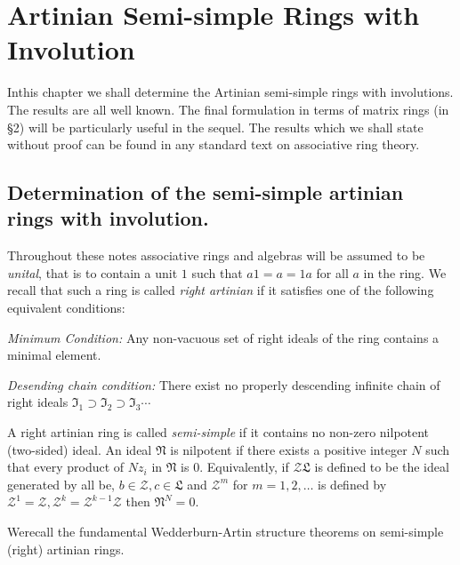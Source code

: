 \setcounter{chapter}{-1}
\chapter{Artinian Semi-simple Rings with Involution}\label{c0}

In\pageoriginale this chapter we shall determine the Artinian
semi-simple rings with involutions. The results are all well
known. The final formulation in terms of matrix rings (in \S 2) will
be particularly useful in the sequel. The results which we shall state
without proof can be found in any standard text on associative ring
theory. 

\section[Determination of the semi-simple artinian
rings...]{Determination of the semi-simple artinian rings with 
involution.}\label{c0:sec1} 

Throughout these notes associative rings and algebras will be assumed
to be {\em unital}, that is to contain a unit $1$ such that $a1=a=1a$
for all $a$ in the ring. We recall that such a ring is called {\em
right artinian} if it satisfies one of the following equivalent
conditions: 

\medskip
{\em Minimum Condition:} Any non-vacuous set of right ideals of the
ring contains a minimal element. 

\medskip
{\em Desending chain condition:} There exist no properly descending
infinite chain of right ideals
$\mathfrak{I}_1\supset\mathfrak{I}_2\supset\mathfrak{I}_3\cdots$ 

A right artinian ring is called {\em semi-simple} if it contains no
non-zero nilpotent (two-sided) ideal. An ideal $\mathfrak{N}$ is
nilpotent if there exists a positive integer $N$ such that every
product of $N z_i$ in $\mathfrak{N}$ is $0$. Equivalently, if  
$\mathscr{Z}\mathfrak{L}$ is defined to be the ideal generated by all
be, $b\in \mathscr{Z}, c\in \mathfrak{L}$ and $\mathscr{Z}^{m}$ for
$m=1, 2, \ldots$ is defined by
$\mathscr{Z}^{1}=\mathscr{Z}, \mathscr{Z}^{k}=\mathscr{Z}^{k-1}\mathscr{Z}$
then $\mathfrak{N}^{N}=0$. 

We\pageoriginale recall the fundamental Wedderburn-Artin structure
theorems on semi-simple (right) artinian rings. 

